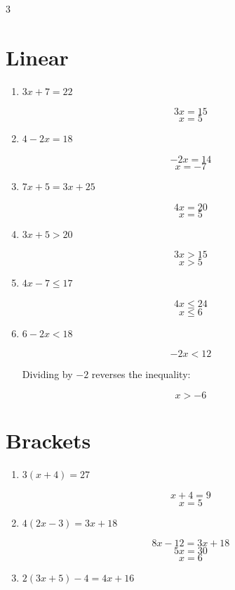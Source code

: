 	\begin{multicols}{3}
		
		\section{Linear}
		
		\begin{enumerate}
			\item
			$3x+7=22$
			
			\[
			3x=15
			\]
			\[
			x=5
			\]
			
			\item
			$4-2x=18$
			
			\[
			-2x=14
			\]
			\[
			x=-7
			\]
			
			\item
			$7x+5=3x+25$
			
			\[
			4x=20
			\]
			\[
			x=5
			\]
			
			\item
			$3x+5>20$
			
			\[
			3x>15
			\]
			\[
			x>5
			\]
			
			\item
			$4x-7\leq17$
			
			\[
			4x\leq24
			\]
			\[
			x\leq6
			\]
			
			\item
			$6-2x<18$
			
			\[
			-2x<12
			\]
			
			Dividing by $-2$ reverses the inequality:
			
			\[
			x>-6
			\]
		\end{enumerate}
		
		\columnbreak
		
		\section{Brackets}
		
		\begin{enumerate}
			\item
			$3(x+4)=27$
			
			\[
			x+4=9
			\]
			\[
			x=5
			\]
			
			\item
			$4(2x-3)=3x+18$
			
			\[
			8x-12=3x+18
			\]
			\[
			5x=30
			\]
			\[
			x=6
			\]
			
			\item
			$2(3x+5)-4=4x+16$
			

\end{enumerate}
\end{multicols}
